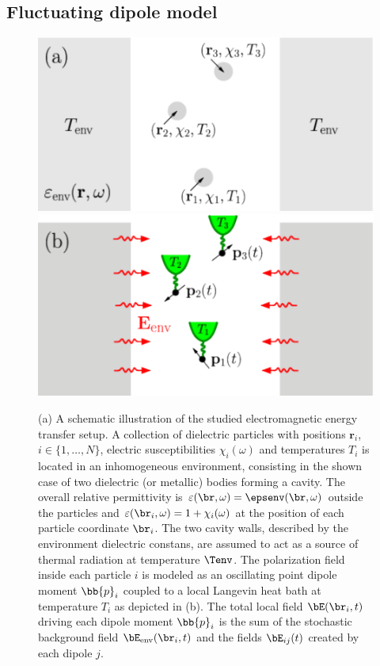 
\subsection{Fluctuating dipole model}

\label{sec:em_methods}

\begin{figure}
 \includegraphics[width=.49\columnwidth]{pics/dipole_pic1a.pdf}
 \includegraphics[width=.49\columnwidth]{pics/dipole_pic1b.pdf}
 \caption{(a) A schematic illustration of the studied electromagnetic energy transfer setup. A collection of dielectric particles with positions $\mathbf{r}_i$, $i\in\{1,\dots,N\}$, electric susceptibilities $\chi_i(\omega)$ and temperatures $T_i$ is located in an inhomogeneous environment, consisting in the shown case of two dielectric (or metallic) bodies forming a cavity. The overall relative permittivity is $\varepsilon(\br,\omega)=\epsenv(\br,\omega)$ outside the particles and $\varepsilon(\br_i,\omega)=1+\chi_i(\omega)$ at the position of each particle coordinate $\br_i$. The two cavity walls, described by the environment dielectric constans, are assumed to act as a source of thermal radiation at temperature $\Tenv$. The polarization field inside each particle $i$ is modeled as an oscillating point dipole moment $\bb{p}_i$ coupled to a local Langevin heat bath at temperature $T_i$ as depicted in (b). The total local field $\bE(\br_i,t)$ driving each dipole moment $\bb{p}_i$ is the sum of the stochastic background field $\bE_{\textrm{env}}(\br_i,t)$ and the fields $\bE_{ij}(t)$ created by each dipole $j$.}%
\label{fig:gfm_dipole_system}
\end{figure}

